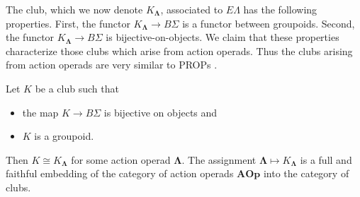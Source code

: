 \documentclass{amsbook} %
\newcommand{\mb}{\mathbf}
\numberwithin{section}{chapter}
\begin{document}
The club, which we now denote $K_{\mb{\Lambda}}$, associated to $E\Lambda$ has the following properties.  First, the functor $K_{\mb{\Lambda}} \rightarrow B\Sigma$ is a functor between groupoids.  Second, the functor $K_{\mb{\Lambda}} \rightarrow B\Sigma$ is  bijective-on-objects.  We claim that these properties characterize those clubs which arise from action operads.  Thus the clubs arising from action operads are very similar to PROPs \cite{mac_prop, markl_prop}.

\begin{thm}\label{thm:club=operad}
Let $K$ be a club such that
\begin{itemize}
\item the map $K \rightarrow B\Sigma$ is bijective on objects and
\item $K$ is a groupoid.
\end{itemize}
Then $K \cong K_{\mb{\Lambda}}$ for some action operad $\mb{\Lambda}$.  The assignment $\mb{\Lambda} \mapsto K_{\mb{\Lambda}}$ is a full and faithful embedding of the category of action operads $\mb{AOp}$ into the category of clubs.
\end{thm}
\end{document}

